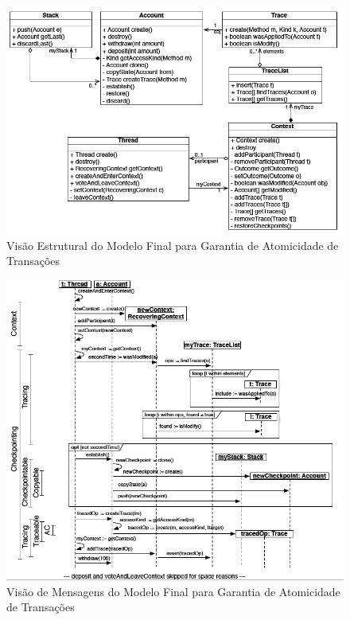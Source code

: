 \begin{landscape}
\begin{figure}
	\centering
	\includegraphics[width=500px]{img/p87_class_final_model.png}
	\caption{Visão Estrutural do Modelo Final para Garantia de Atomicidade de
	Transações}\label{fig:p87_class_final_model}
\end{figure}
\end{landscape}

\begin{landscape}
\begin{figure}
	\centering
	\includegraphics[width=500px]{img/p87_sequence_final_model.png}
	\caption{Visão de Mensagens do Modelo Final para Garantia de Atomicidade de
	Transações}\label{fig:p87_sequence_final_model}
\end{figure}
\end{landscape}

